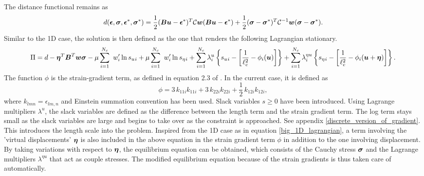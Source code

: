 \documentclass[10pt,review]{cas-sc}
\begin{document}
The distance functional remains as
\begin{equation}
	d(\mbox{\boldmath $\epsilon$},\mbox{\boldmath $\sigma$},\mbox{\boldmath $\epsilon$}^*,\mbox{\boldmath $\sigma$}^*) = \frac{1}{2}(\mbox{\boldmath $B$} \mbox{\boldmath $u$} - \mbox{\boldmath $\epsilon$}^*)^T\mathcal{C}\mbox{\boldmath $w$}(\mbox{\boldmath $B$} \mbox{\boldmath $u$} - \mbox{\boldmath $\epsilon$}^*) + \frac{1}{2}(\mbox{\boldmath $\sigma$} - \mbox{\boldmath $\sigma$}^*)^T\mathcal{C}^{-1}\mbox{\boldmath $w$}(\mbox{\boldmath $\sigma$} - \mbox{\boldmath $\sigma$}^*).
\end{equation}
Similar to the 1D case, the solution is then defined as the one that renders the following Lagrangian stationary.
\begin{equation}
	\Pi  = d -\mbox{\boldmath $\eta$} ^T \mbox{\boldmath $B$}^T \mbox{\boldmath $w$} \mbox{\boldmath $\sigma$} - \mu \sum_{i=1}^{N_c} \
	w_i' \ln s_u{_i} + \mu \sum_{i=1}^{N_c} \
	w_i' \ln s_\eta{_i} +\sum_{i=1}^{N_c} \lambda^u_i \left\{ s_u{_i}  - \left[ \frac{1}{\ell_c ^2}- \phi_i(\mbox{\boldmath $u$}) \right]  \right\} 
	+\sum_{i=1}^{N_c} \lambda^{\eta u}_ i \left\{ s_\eta{_i}  - \left[ \frac{1}{\ell_c ^2}- \phi_i(\mbox{\boldmath $u$}+\mbox{\boldmath $\eta$}) \right]  \right\}.
\end{equation}
The function $\phi$ is the strain-gradient term, as defined in equation 2.3 of \cite{Mindlin1968}. In the current case, it is defined as 
\begin{equation}
	\phi = 3\,k_{11i}k_{11i}	+ 3\,k_{22i}k_{22i}	+ \frac{1}{2}\,k_{12i}k_{12i}, \label{mindlin_energy}
\end{equation}
where $k_{lmn} = \epsilon_{lm,n}$ and Einstein summation convention has been used. Slack variables $s \geq 0$ have been introduced. Using Lagrange multipliers $\lambda^u$, the slack variables are defined as the difference between the length term and the strain gradient term. The log term stays small as the slack variables are large and begins to take over as the constraint is approached. See appendix \ref{discrete_version_of_gradient}. This introduces the length scale into the problem. Inspired from the 1D case as in equation \eqref{big_1D_lagrangian}, a term involving the 'virtual displacements' $\mbox{\boldmath $\eta$}$ is also included in the above equation in the strain gradient term $\phi$ in addition to the one involving displacement. By taking variations with respect to $\mbox{\boldmath $\eta$}$, the equilibrium equation can be obtained, which consists of the Cauchy stress $\mbox{\boldmath $\sigma$}$ and the Lagrange multipliers $\lambda^{\eta u}$ that act as couple stresses. The modified equilibrium equation because of the strain gradients is thus taken care of automatically.
\end{document}
